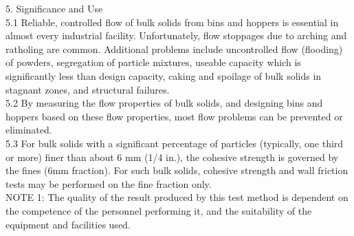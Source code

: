 5. Significance and Use \\
5.1 Reliable, controlled flow of bulk solids from bins and hoppers is essential in almost every industrial facility. Unfortunately, flow stoppages due to arching and ratholing are common. Additional problems include uncontrolled flow (flooding) of powders, segregation of particle mixtures, useable capacity which is significantly less than design capacity, caking and spoilage of bulk solids in stagnant zones, and structural failures. \\
5.2 By measuring the flow properties of bulk solids, and designing bins and hoppers based on these flow properties, most flow problems can be prevented or eliminated. \\
5.3 For bulk solids with a significant percentage of particles (typically, one third or more) finer than about 6 mm (1/4 in.), the cohesive strength is governed by the fines (6mm fraction). For such bulk solids, cohesive strength and wall friction tests may be performed on the fine fraction only. \\
NOTE 1: The quality of the result produced by this test method is dependent on the competence of the personnel performing it, and the suitability of the equipment and facilities used. \\


